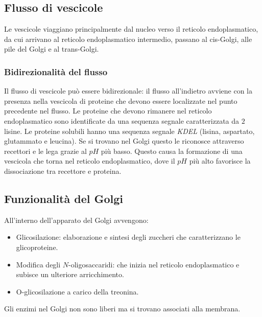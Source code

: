 	\subsection{Flusso di vescicole}
	Le vescicole viaggiano principalmente dal nucleo verso il reticolo endoplasmatico, da cui arrivano al reticolo endoplasmatico intermedio, passano al cis-Golgi, alle pile del Golgi e al trans-Golgi.

		\subsubsection{Bidirezionalit\`a del flusso}
		Il flusso di vescicole pu\`o essere bidirezionale: il flusso all'indietro avviene con la presenza nella vescicola di proteine che devono essere localizzate nel punto precedente nel flusso.
		Le proteine che devono rimanere nel reticolo endoplasmatico sono identificate da una sequenza segnale caratterizzata da $2$ lisine.
		Le proteine solubili hanno una sequenza segnale \emph{KDEL} (lisina, aspartato, glutammato e leucina).
		Se si trovano nel Golgi questo le riconosce attraverso recettori e le lega grazie al $pH$ pi\`u basso.
		Questo causa la formazione di una vescicola che torna nel reticolo endoplasmatico, dove il $pH$ pi\`u alto favorisce la dissociazione tra recettore e proteina.

	\subsection{Funzionalit\`a del Golgi}
	All'interno dell'apparato del Golgi avvengono:
	\begin{multicols}{2}
		\begin{itemize}
			\item Glicosilazione: elaborazione e sintesi degli zuccheri che caratterizzano le glicoproteine.
			\item Modifica degli $N$-oligosaccaridi: che inizia nel reticolo endoplasmatico e subisce un ulteriore arricchimento.
			\item O-glicosilazione a carico della treonina.
		\end{itemize}
	\end{multicols}
	Gli enzimi nel Golgi non sono liberi ma si trovano associati alla membrana.

